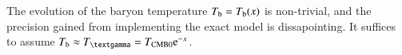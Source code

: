 
    The evolution of the baryon temperature $T_\mathrm{b}=T_\mathrm{b}(x)$ is non-trivial, and the precision gained from implementing the exact model is dissapointing. It suffices to assume $T\ped{b}\approx T\gped{\textgamma} = \TCMB \eu^{-x}$.~\citep{Callin2006}
    


    
